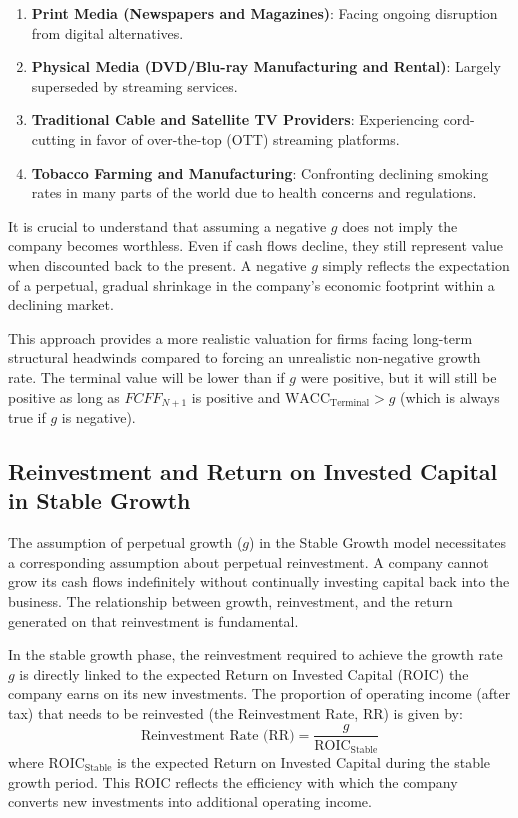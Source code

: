 \begin{enumerate}
    \item \textbf{Print Media (Newspapers and Magazines)}: Facing ongoing disruption from digital alternatives.
    \item \textbf{Physical Media (DVD/Blu-ray Manufacturing and Rental)}: Largely superseded by streaming services.
    \item \textbf{Traditional Cable and Satellite TV Providers}: Experiencing cord-cutting in favor of over-the-top (OTT) streaming platforms.
    \item \textbf{Tobacco Farming and Manufacturing}: Confronting declining smoking rates in many parts of the world due to health concerns and regulations.
\end{enumerate}

It is crucial to understand that assuming a negative \(g\) does not imply the company becomes worthless. Even if cash flows decline, they still represent value when discounted back to the present. A negative \(g\) simply reflects the expectation of a perpetual, gradual shrinkage in the company's economic footprint within a declining market. 

This approach provides a more realistic valuation for firms facing long-term structural headwinds compared to forcing an unrealistic non-negative growth rate. The terminal value will be lower than if \(g\) were positive, but it will still be positive as long as \(FCFF_{N+1}\) is positive and \(\text{WACC}_{\text{Terminal}} > g\) (which is always true if \(g\) is negative).

\subsection{Reinvestment and Return on Invested Capital in Stable Growth} \label{sec:reinvestment_roic_stable}
The assumption of perpetual growth (\(g\)) in the Stable Growth model necessitates a corresponding assumption about perpetual reinvestment. A company cannot grow its cash flows indefinitely without continually investing capital back into the business. The relationship between growth, reinvestment, and the return generated on that reinvestment is fundamental.

In the stable growth phase, the reinvestment required to achieve the growth rate \(g\) is directly linked to the expected Return on Invested Capital (ROIC) the company earns on its new investments. The proportion of operating income (after tax) that needs to be reinvested (the Reinvestment Rate, RR) is given by:
\begin{equation} \label{eq:reinvestment_rate_stable}
    \text{Reinvestment Rate (RR)} = \frac{g}{\text{ROIC}_{\text{Stable}}}
\end{equation}
where \(\text{ROIC}_{\text{Stable}}\) is the expected Return on Invested  Capital during the stable growth period. This ROIC reflects the efficiency with which the company converts new investments into additional operating income.

